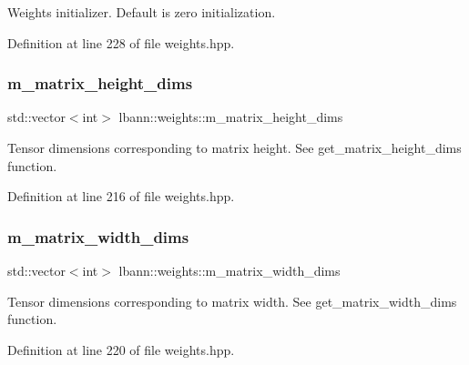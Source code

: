 Weights initializer. Default is zero initialization. 

Definition at line 228 of file weights.\+hpp.

\mbox{\label{classlbann_1_1weights_a9287dfbd8a7e4a9f5e0d6371d43ee92f}} 
\subsubsection{\texorpdfstring{m\+\_\+matrix\+\_\+height\+\_\+dims}{m\_matrix\_height\_dims}}
{\footnotesize\ttfamily std\+::vector$<$int$>$ lbann\+::weights\+::m\+\_\+matrix\+\_\+height\+\_\+dims\hspace{0.3cm}{\ttfamily [private]}}

Tensor dimensions corresponding to matrix height. See get\+\_\+matrix\+\_\+height\+\_\+dims function. 

Definition at line 216 of file weights.\+hpp.

\mbox{\label{classlbann_1_1weights_a8317a198bc5b4cd6bee2c806eefd1f12}} 
\subsubsection{\texorpdfstring{m\+\_\+matrix\+\_\+width\+\_\+dims}{m\_matrix\_width\_dims}}
{\footnotesize\ttfamily std\+::vector$<$int$>$ lbann\+::weights\+::m\+\_\+matrix\+\_\+width\+\_\+dims\hspace{0.3cm}{\ttfamily [private]}}

Tensor dimensions corresponding to matrix width. See get\+\_\+matrix\+\_\+width\+\_\+dims function. 

Definition at line 220 of file weights.\+hpp.

\mbox{\label{classlbann_1_1weights_a08abf0bb29aa47be21bfc7473b4b9b99}} 
